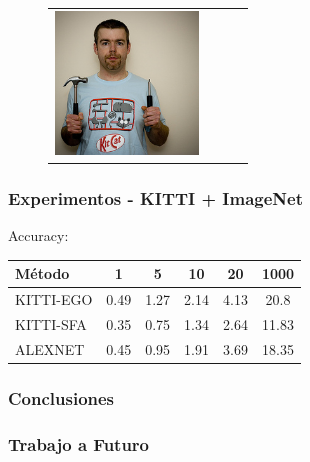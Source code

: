 \documentclass{beamer}
\begin{document}
\begin{frame}
\begin{figure}
{\begin{tabular}{cccc}
\includegraphics[width = 1.5in]{./images/imagenet/n04154565_5799.JPEG} \\
\end{tabular}
}
\end{figure}
\end{frame}





\begin{frame}
\frametitle{Experimentos - KITTI + ImageNet}
Accuracy:
\begin{table}
\centering
\begin{tabular}{l|ccccc}
\hline
\multicolumn{1}{l}{Método}
& \multicolumn{1}{c}{1}
& \multicolumn{1}{c}{5}
& \multicolumn{1}{c}{10}
& \multicolumn{1}{c}{20}
& \multicolumn{1}{c}{1000} \\ \cline{1-6}
\hline

KITTI-EGO & 0.49 & 1.27 & 2.14 & 4.13 & 20.8\\
KITTI-SFA & 0.35 & 0.75 & 1.34 & 2.64 & 11.83\\
ALEXNET & 0.45 & 0.95 & 1.91 & 3.69 & 18.35\\

\hline
\end{tabular}
\end{table}
\end{frame}





\begin{frame}
\frametitle{Conclusiones}
\end{frame}





\begin{frame}
\frametitle{Trabajo a Futuro}
\end{frame}
\end{document}

